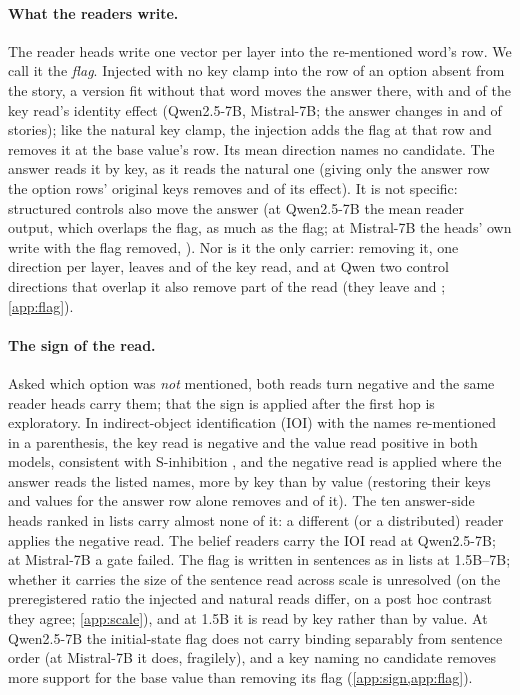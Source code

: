 \paragraph{What the readers write.}
The reader heads write one vector per layer into the re-mentioned word's row. We call it the \emph{flag}. Injected with no key clamp into the row of an option absent from the story, a version fit without that word moves the answer there, with \ci{\JdOneRatioQwenSeven}{\JdOneRatioQwenSevenLo}{\JdOneRatioQwenSevenHi} and \ci{\JdOneRatioMistralSeven}{\JdOneRatioMistralSevenLo}{\JdOneRatioMistralSevenHi} of the key read's identity effect (Qwen2.5-7B, Mistral-7B; the answer changes in \pct{\JdOnePiXQwenSeven} and \pct{\JdOnePiXMistralSeven} of stories); like the natural key clamp, the injection adds the flag at that row and removes it at the base value's row. Its mean direction names no candidate. The answer reads it by key, as it reads the natural one (giving only the answer row the option rows' original keys removes \JdFourKQwenSeven{} and \JdFourKMistralSeven{} of its effect). It is not specific: structured controls also move the answer (at Qwen2.5-7B the mean reader output, which overlaps the flag, \JdTwoRatioMeanHQwenSeven{} as much as the flag; at Mistral-7B the heads' own write with the flag removed, \JdTwoRatioOrthMistralSeven). Nor is it the only carrier: removing it, one direction per layer, leaves \ci{\JdThreeRhoFlagQwenSeven}{\JdThreeRhoFlagQwenSevenLo}{\JdThreeRhoFlagQwenSevenHi} and \ci{\JdThreeRhoFlagMistralSeven}{\JdThreeRhoFlagMistralSevenLo}{\JdThreeRhoFlagMistralSevenHi} of the key read, and at Qwen two control directions that overlap it also remove part of the read (they leave \JdThreeRhoPconeQwenSeven{} and \JdThreeRhoMeanHQwenSeven; \cref{app:flag}).

\paragraph{The sign of the read.}
Asked which option was \emph{not} mentioned, both reads turn negative and the same reader heads carry them; that the sign is applied after the first hop is exploratory. In indirect-object identification (IOI) with the names re-mentioned in a parenthesis, the key read is negative and the value read positive in both models, consistent with S-inhibition \citep{wang2022ioi}, and the negative read is applied where the answer reads the listed names, more by key than by value (restoring their keys and values for the answer row alone removes \JdRouteKVQwenSeven{} and \JdRouteKVMistralSeven{} of it). The ten answer-side heads ranked in lists carry almost none of it: a different (or a distributed) reader applies the negative read. The belief readers carry the IOI read at Qwen2.5-7B; at Mistral-7B a gate failed. The flag is written in sentences as in lists at 1.5B--7B; whether it carries the size of the sentence read across scale is unresolved (on the preregistered ratio the injected and natural reads differ, on a post hoc contrast they agree; \cref{app:scale}), and at 1.5B it is read by key rather than by value. At Qwen2.5-7B the initial-state flag does not carry binding separably from sentence order (at Mistral-7B it does, fragilely), and a key naming no candidate removes more support for the base value than removing its flag (\cref{app:sign,app:flag}).
